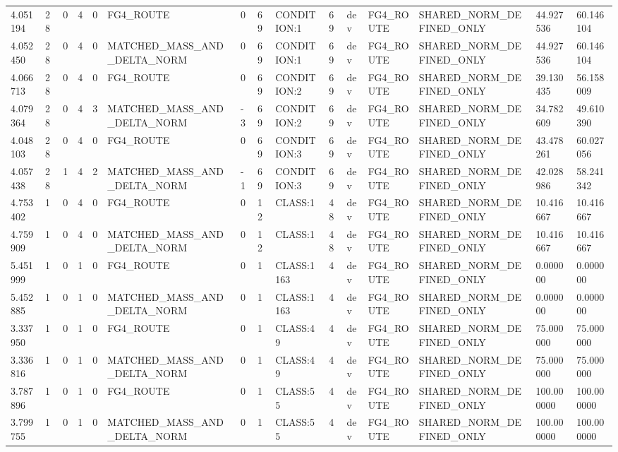 \begin{tabular}{lllllllllllllll}
4.051194 & 28 & 0 & 4 & 0 & FG4\_ROUTE & 0 & 69 & CONDITION:1 & 69 & dev & FG4\_ROUTE & SHARED\_NORM\_DEFINED\_ONLY & 44.927536 & 60.146104 \\
4.052450 & 28 & 0 & 4 & 0 & MATCHED\_MASS\_AND\_DELTA\_NORM & 0 & 69 & CONDITION:1 & 69 & dev & FG4\_ROUTE & SHARED\_NORM\_DEFINED\_ONLY & 44.927536 & 60.146104 \\
4.066713 & 28 & 0 & 4 & 0 & FG4\_ROUTE & 0 & 69 & CONDITION:2 & 69 & dev & FG4\_ROUTE & SHARED\_NORM\_DEFINED\_ONLY & 39.130435 & 56.158009 \\
4.079364 & 28 & 0 & 4 & 3 & MATCHED\_MASS\_AND\_DELTA\_NORM & -3 & 69 & CONDITION:2 & 69 & dev & FG4\_ROUTE & SHARED\_NORM\_DEFINED\_ONLY & 34.782609 & 49.610390 \\
4.048103 & 28 & 0 & 4 & 0 & FG4\_ROUTE & 0 & 69 & CONDITION:3 & 69 & dev & FG4\_ROUTE & SHARED\_NORM\_DEFINED\_ONLY & 43.478261 & 60.027056 \\
4.057438 & 28 & 1 & 4 & 2 & MATCHED\_MASS\_AND\_DELTA\_NORM & -1 & 69 & CONDITION:3 & 69 & dev & FG4\_ROUTE & SHARED\_NORM\_DEFINED\_ONLY & 42.028986 & 58.241342 \\
4.753402 & 1 & 0 & 4 & 0 & FG4\_ROUTE & 0 & 12 & CLASS:1 & 48 & dev & FG4\_ROUTE & SHARED\_NORM\_DEFINED\_ONLY & 10.416667 & 10.416667 \\
4.759909 & 1 & 0 & 4 & 0 & MATCHED\_MASS\_AND\_DELTA\_NORM & 0 & 12 & CLASS:1 & 48 & dev & FG4\_ROUTE & SHARED\_NORM\_DEFINED\_ONLY & 10.416667 & 10.416667 \\
5.451999 & 1 & 0 & 1 & 0 & FG4\_ROUTE & 0 & 1 & CLASS:1163 & 4 & dev & FG4\_ROUTE & SHARED\_NORM\_DEFINED\_ONLY & 0.000000 & 0.000000 \\
5.452885 & 1 & 0 & 1 & 0 & MATCHED\_MASS\_AND\_DELTA\_NORM & 0 & 1 & CLASS:1163 & 4 & dev & FG4\_ROUTE & SHARED\_NORM\_DEFINED\_ONLY & 0.000000 & 0.000000 \\
3.337950 & 1 & 0 & 1 & 0 & FG4\_ROUTE & 0 & 1 & CLASS:49 & 4 & dev & FG4\_ROUTE & SHARED\_NORM\_DEFINED\_ONLY & 75.000000 & 75.000000 \\
3.336816 & 1 & 0 & 1 & 0 & MATCHED\_MASS\_AND\_DELTA\_NORM & 0 & 1 & CLASS:49 & 4 & dev & FG4\_ROUTE & SHARED\_NORM\_DEFINED\_ONLY & 75.000000 & 75.000000 \\
3.787896 & 1 & 0 & 1 & 0 & FG4\_ROUTE & 0 & 1 & CLASS:55 & 4 & dev & FG4\_ROUTE & SHARED\_NORM\_DEFINED\_ONLY & 100.000000 & 100.000000 \\
3.799755 & 1 & 0 & 1 & 0 & MATCHED\_MASS\_AND\_DELTA\_NORM & 0 & 1 & CLASS:55 & 4 & dev & FG4\_ROUTE & SHARED\_NORM\_DEFINED\_ONLY & 100.000000 & 100.000000 \\

\end{tabular}

